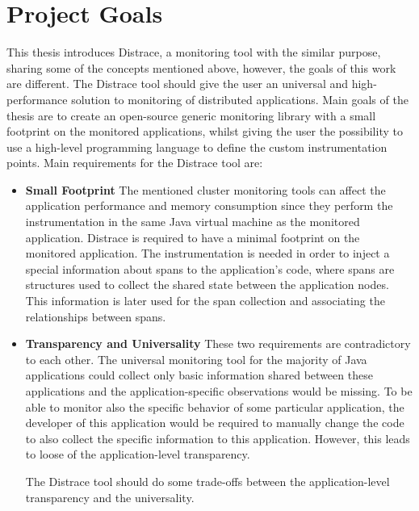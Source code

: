 \section{Project Goals}
This thesis introduces Distrace, a monitoring tool with the similar purpose, sharing some of the concepts mentioned above, however, the goals of this work are different. The Distrace tool should give the user an universal and high-performance solution to monitoring of distributed applications. Main goals of the thesis are to create an open-source generic monitoring library with a small footprint on the monitored applications, whilst giving the user the possibility to use a high-level programming language to define the custom instrumentation points. Main requirements for the Distrace tool are:
\begin{itemize}
	\item \textbf{Small Footprint} \newline
	 The mentioned cluster monitoring tools can affect the application performance and memory consumption since they perform the instrumentation in the same Java virtual machine as the monitored application. Distrace is required to have a minimal footprint on the monitored application. The instrumentation is needed in order to inject a special information about spans to the application's code, where spans are structures used to collect the shared state between the application nodes. This information is later used for the span collection and associating the relationships between spans.
	\item \textbf{Transparency and Universality} \newline
	These two requirements are contradictory to each other. The universal monitoring tool for the majority of Java applications could collect only basic information shared between these applications and the application-specific observations would be missing. To be able to monitor also the specific behavior of some particular application, the developer of this application would be required to manually change the code to also collect the specific information to this application. However, this leads to loose of the application-level transparency. 
	
	The Distrace tool should do some trade-offs between the application-level transparency and the universality. 
	

\end{itemize}
